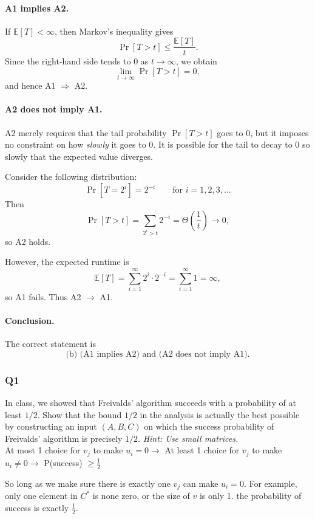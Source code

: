 \documentclass[9pt]{extarticle}
\begin{document}
\paragraph{A1 implies A2.}
If $\mathbb{E}[T] < \infty$, then Markov's inequality gives
\[
\Pr[T > t] \le \frac{\mathbb{E}[T]}{t}.
\]
Since the right-hand side tends to $0$ as $t \to \infty$, we obtain
\[
\lim_{t \to \infty} \Pr[T > t] = 0,
\]
and hence A1 $\Rightarrow$ A2.

\paragraph{A2 does not imply A1.}
A2 merely requires that the tail probability $\Pr[T > t]$ goes to $0$,
but it imposes no constraint on how \emph{slowly} it goes to $0$.
It is possible for the tail to decay to $0$ so slowly that the expected
value diverges.

Consider the following distribution:
\[
\Pr[T = 2^{i}] = 2^{-i} \qquad \text{for } i = 1,2,3,\dots
\]
Then
\[
\Pr[T > t]
= \sum_{2^{i} > t} 2^{-i}
= \Theta\!\left(\frac{1}{t}\right)
\longrightarrow 0,
\]
so A2 holds.

However, the expected runtime is
\[
\mathbb{E}[T]
= \sum_{i=1}^{\infty} 2^{i} \cdot 2^{-i}
= \sum_{i=1}^{\infty} 1
= \infty,
\]
so A1 fails.  
Thus A2 $\rightarrow$ A1.

\paragraph{Conclusion.}
The correct statement is
\[
\boxed{\text{(b) (A1 implies A2) and (A2 does not imply A1).}}
\]

\subsubsection*{Q1}
In class, we showed that Freivalds’ algorithm succeeds with a probability of at least $1/2$.  
Show that the bound $1/2$ in the analysis is actually the best possible by constructing an input $(A,B,C)$ on which the success probability of Freivalds’ algorithm is precisely $1/2$.  
\emph{Hint: Use small matrices.}\\

At most 1 choice for $v_j$ to make $u_i = 0 \rightarrow$ At least 1 choice for $v_j$ to make $u_i \neq 0 \rightarrow$ P(success) $\geq \frac{1}{2}$

So long as we make sure there is exactly one $v_j$ can make $u_i =0$. For example, only one element in $C^*$ is none zero, or the size of $v$ is only 1. the probability of success is exactly $\frac{1}{2}$.
\end{document}

